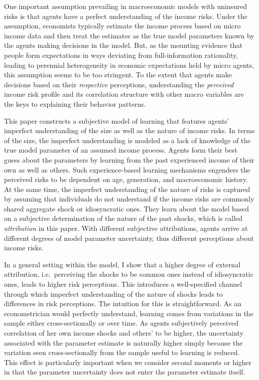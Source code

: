 \documentclass[12pt,notitlepage,onecolumn,aps,pra]{article}
\begin{document}
One important assumption prevailing in macroeconomic models with
uninsured risks is that agents have a perfect understanding of the
income risks. Under the assumption, economists typically estimate the
income process based on micro income data and then treat the estimates
as the true model parameters known by the agents making decisions in the
model. But, as the mounting evidence that people form expectations in
ways deviating from full-information rationality, leading to perennial
heterogeneity in economic expectations held by micro agents, this
assumption seems to be too stringent. To the extent that agents make
decisions based on their \emph{respective} perceptions, understanding
the \emph{perceived} income risk profile and its correlation structure
with other macro variables are the keys to explaining their behavior
patterns.

This paper constructs a subjective model of learning that features
agents' imperfect understanding of the size as well as the nature of
income risks. In terms of the size, the imperfect understanding is
modeled as a lack of knowledge of the true model parameter of an assumed
income process. Agents form their best guess about the parameters by
learning from the past experienced income of their own as well as
others. Such experience-based learning mechanisms engenders the
perceived risks to be dependent on age, generation, and macroeconomic
history. At the same time, the imperfect understanding of the nature of
risks is captured by assuming that individuals do not understand if the
income risks are commonly shared aggregate shock or idiosyncratic ones.
They learn about the model based on a subjective determination of the
nature of the past shocks, which is called \emph{attribution} in this
paper. With different subjective attributions, agents arrive at
different degrees of model parameter uncertainty, thus different
perceptions about income risks.

In a general setting within the model, I show that a higher degree of
external attribution, i.e.~perceiving the shocks to be common ones
instead of idiosyncratic ones, leads to higher risk perceptions. This
introduces a well-specified channel through which imperfect
understanding of the nature of shocks leads to differences in risk
perceptions. The intuition for this is straightforward. As an
econometrician would perfectly understand, learning comes from
variations in the sample either cross-sectionally or over time. As
agents subjectively perceived correlation of her own income shocks and
others' to be higher, the uncertainty associated with the parameter
estimate is naturally higher simply because the variation seen
cross-sectionally from the sample useful to learning is reduced. This
effect is particularly important when we consider second moments or
higher in that the parameter uncertainty does not enter the parameter
estimate itself.
\end{document}

